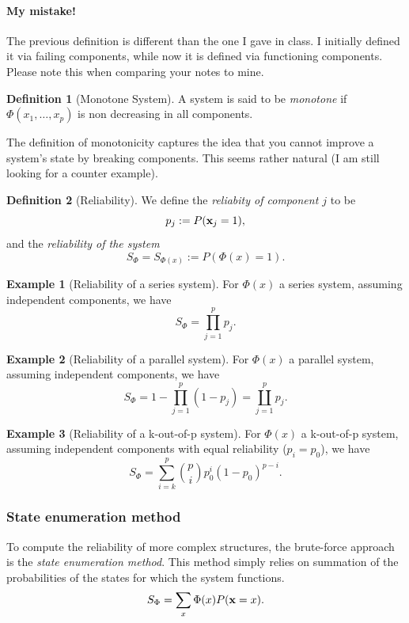 \documentclass[12pt,a4paper]{report}
\theoremstyle{plain}
\theoremstyle{definition}
\newtheorem{definition}{Definition}
\newtheorem{example}{Example}
\newcommand{\struct}{\Phi}
\begin{document}
\begin{tcolorbox}
\paragraph{My mistake!}
The previous definition is different than the one I gave in class. 
I initially defined it via failing components, while now it is defined via functioning components.
Please note this when comparing your notes to mine.
\end{tcolorbox}




\begin{definition}[Monotone System]
A system is said to be \emph{monotone} if $\struct(x_1,\dots,x_p)$ is non decreasing in all components.
\end{definition}
The definition of monotonicity captures the idea that you cannot improve a system's state by breaking components.
This seems rather natural (I am still looking for a counter example).






\begin{definition}[Reliability]
We define the \emph{reliabity of component $j$} to be $$p_j:= P(\mathbf{x}_j=1),$$ 
and  the \emph{reliability of the system} 
$$ S_\struct = S_{\struct(x)}:=P(\struct(x)=1).$$
\end{definition}


\begin{example}[Reliability of a series system]
For $\Phi(x)$ a series system, assuming independent components, we have
$$ S_\struct= \prod_{j=1}^{p} p_j.$$
\end{example}


\begin{example}[Reliability of a parallel system]
For $\Phi(x)$ a parallel system, assuming independent components, we have
$$ S_\struct= 1-\prod_{j=1}^{p} (1-p_j)= \coprod_{j=1}^p p_j. $$
\end{example}


\begin{example}[Reliability of a k-out-of-p system]
For $\Phi(x)$ a k-out-of-p system, assuming independent components with equal reliability ($p_i=p_0$), we have
$$ S_\struct= \sum_{i=k}^{p} \binom{p}{i} p_0^i (1-p_0)^{p-i} .$$
\end{example}



\subsubsection{State enumeration method}
To compute the reliability of more complex structures, the brute-force approach is the \emph{state enumeration method}. 
This method simply relies on summation of the probabilities of the states for which the system functions.
$$ S_\struct= \sum_{x} \Phi(x) P(\x=x).$$
\end{document}
